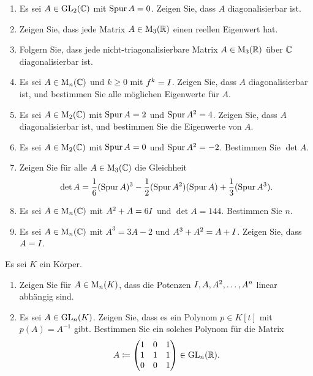 \documentclass[a4paper, 10pt]{scrartcl}
\begin{document}
\begin{question}[subtitle = Eigenwerte und Diagonalisierbarkeit]
  \begin{enumerate}
    \item
      Es sei $A \in \operatorname{GL}_{2}(\mathbb{C})$ mit $\operatorname{Spur} A = 0$.
      Zeigen Sie, dass $A$ diagonalisierbar ist.
    \item
      Zeigen Sie, dass jede Matrix $A \in \operatorname{M}_{3}(\mathbb{R})$ einen reellen Eigenwert hat.
    \item
      Folgern Sie, dass jede nicht-triagonalisierbare Matrix $A \in \operatorname{M}_{3}(\mathbb{R})$ über $\mathbb{C}$ diagonalisierbar ist.
    \item
      Es sei $A \in \operatorname{M}_{n}(\mathbb{C})$ und $k \geq 0$ mit $f^k = I$.
      Zeigen Sie, dass $A$ diagonalisierbar ist, und bestimmen Sie alle möglichen Eigenwerte für $A$.
    \item
      Es sei $A \in \operatorname{M}_{2}(\mathbb{C})$ mit $\operatorname{Spur} A = 2$ und $\operatorname{Spur} A^2 = 4$.
      Zeigen Sie, dass $A$ diagonalisierbar ist, und bestimmen Sie die Eigenwerte von $A$.
    \item
      Es sei $A \in \operatorname{M}_{2}(\mathbb{C})$ mit $\operatorname{Spur} A = 0$ und $\operatorname{Spur} A^2 = -2$.
      Bestimmen Sie $\det A$.
    \item
      Zeigen Sie für alle $A \in \operatorname{M}_{3}(\mathbb{C})$ die Gleichheit
      \[
          \det A
        =   \frac{1}{6} (\operatorname{Spur} A)^3
          - \frac{1}{2} (\operatorname{Spur} A^2)(\operatorname{Spur} A)
          + \frac{1}{3} (\operatorname{Spur} A^3).
      \]
    \item
      Es sei $A \in \operatorname{M}_{n}(\mathbb{C})$ mit $A^2 + A = 6 I$ und $\det A = 144$.
      Bestimmen Sie $n$.
    \item
      Es sei $A \in \operatorname{M}_{n}(\mathbb{C})$ mit $A^3 = 3A - 2$ und $A^3 + A^2 = A + I$.
      Zeigen Sie, dass $A = I$.
  \end{enumerate}
\end{question}





\begin{question}[subtitle = Cayley-Hamilton]
  Es sei $K$ ein Körper.
  \begin{enumerate}
    \item
      Zeigen Sie für $A \in \operatorname{M}_{n}(K)$, dass die Potenzen $I, A, A^2, \dotsc, A^n$ linear abhängig sind.
    \item
      Es sei $A \in \operatorname{GL}_{n}(K)$.
      Zeigen Sie, dass es ein Polynom $p \in K[t]$ mit $p(A) = A^{-1}$ gibt.
      Bestimmen Sie ein solches Polynom für die Matrix
      \[
                  A
        \coloneqq \begin{pmatrix}
                    1 & 0 & 1 \\
                    1 & 1 & 1 \\
                    0 & 0 & 1
                  \end{pmatrix}
        \in \operatorname{GL}_{n}(\mathbb{R}).
      \]
  \end{enumerate}
\end{question}
\end{document}
